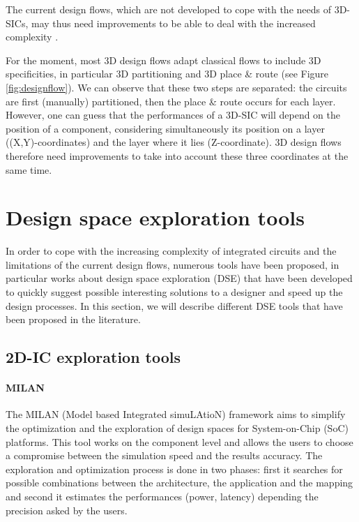 The current design flows, which are not developed to cope with the needs of 3D-SICs, may thus need improvements to be able to deal with the increased complexity \cite{vanderbiest06, PFF10}.

For the moment, most 3D design flows adapt classical flows to include 3D specificities, in particular 3D partitioning and 3D place \& route (see Figure \ref{fig:designflow}). We can observe that these two steps are separated: the circuits are first (manually) partitioned, then the place \& route occurs for each layer. However, one can guess that the performances of a 3D-SIC will depend on the position of a component, considering simultaneously its position on a layer ((X,Y)-coordinates) and the layer where it lies (Z-coordinate). 3D design flows therefore need improvements to take into account these three coordinates at the same time.

\section{Design space exploration tools}

In order to cope with the increasing complexity of integrated circuits and the limitations of the current design flows, numerous tools have been proposed, in particular works about design space exploration (DSE) that have been developed to quickly suggest possible interesting solutions to a designer and speed up the design processes. In this section, we will describe different DSE tools that have been proposed in the literature.

\subsection{2D-IC exploration tools}

\paragraph{MILAN}

The MILAN (Model based Integrated simuLAtioN) framework \cite{Mohanty02rapidsystem-level} aims to simplify the optimization and the exploration of design spaces for System-on-Chip (SoC) platforms. This tool works on the component level and allows the users to choose a compromise between the simulation speed and the results accuracy. The exploration and optimization process is done in two phases: first it searches for possible combinations between the architecture, the application and the mapping and second it estimates the performances (power, latency) depending the precision asked by the users.

